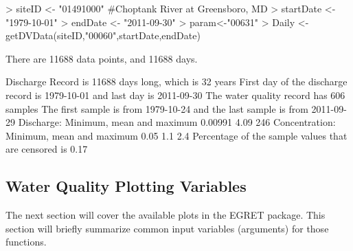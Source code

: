 \documentclass[a4paper,11pt]{article}
\begin{document}
\begin{Schunk}
\begin{Sinput}
> siteID <- "01491000" #Choptank River at Greensboro, MD
> startDate <- "1979-10-01"
> endDate <- "2011-09-30"
> param<-"00631"
> Daily <- getDVData(siteID,"00060",startDate,endDate)
\end{Sinput}
\begin{Soutput}
There are  11688 data points, and  11688 days.
\end{Soutput}
\begin{Soutput}
 Discharge Record is 11688 days long, which is 32 years
 First day of the discharge record is 1979-10-01 and last day is 2011-09-30
 The water quality record has 606 samples
 The first sample is from 1979-10-24 and the last sample is from 2011-09-29
 Discharge: Minimum, mean and maximum 0.00991 4.09 246
 Concentration: Minimum, mean and maximum 0.05 1.1 2.4
 Percentage of the sample values that are censored is 0.17 %
\end{Soutput}
\end{Schunk}

\subsection{Water Quality Plotting Variables}
\label{sec:wqVariables}
The next section will cover the available plots in the EGRET package. This section will briefly summarize common input variables (arguments) for those functions.
\end{document}
